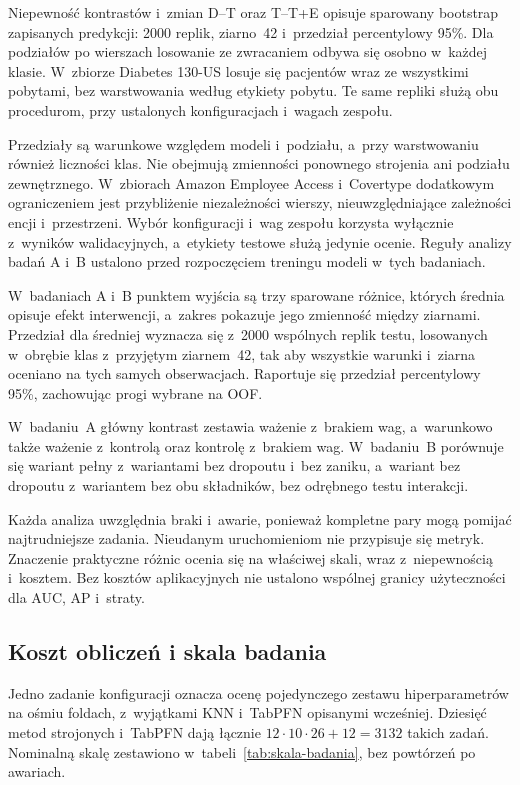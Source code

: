 Niepewność kontrastów i~zmian D--T oraz T--T+E opisuje sparowany bootstrap zapisanych predykcji: 2000 replik, ziarno~42 i~przedział percentylowy 95\%. Dla podziałów po wierszach losowanie ze zwracaniem odbywa się osobno w~każdej klasie. W~zbiorze Diabetes 130-US losuje się pacjentów wraz ze wszystkimi pobytami, bez warstwowania według etykiety pobytu. Te same repliki służą obu procedurom, przy ustalonych konfiguracjach i~wagach zespołu.

Przedziały są warunkowe względem modeli i~podziału, a~przy warstwowaniu również liczności klas. Nie obejmują zmienności ponownego strojenia ani podziału zewnętrznego. W~zbiorach Amazon Employee Access i~Covertype dodatkowym ograniczeniem jest przybliżenie niezależności wierszy, nieuwzględniające zależności encji i~przestrzeni. Wybór konfiguracji i~wag zespołu korzysta wyłącznie z~wyników walidacyjnych, a~etykiety testowe służą jedynie ocenie. Reguły analizy badań A i~B ustalono przed rozpoczęciem treningu modeli w~tych badaniach.

W~badaniach A i~B punktem wyjścia są trzy sparowane różnice, których średnia opisuje efekt interwencji, a~zakres pokazuje jego zmienność między ziarnami. Przedział dla średniej wyznacza się z~2000 wspólnych replik testu, losowanych w~obrębie klas z~przyjętym ziarnem~42, tak aby wszystkie warunki i~ziarna oceniano na tych samych obserwacjach. Raportuje się przedział percentylowy 95\%, zachowując progi wybrane na OOF.

W~badaniu~A główny kontrast zestawia ważenie z~brakiem wag, a~warunkowo także ważenie z~kontrolą oraz kontrolę z~brakiem wag. W~badaniu~B porównuje się wariant pełny z~wariantami bez dropoutu i~bez zaniku, a~wariant bez dropoutu z~wariantem bez obu składników, bez odrębnego testu interakcji.

Każda analiza uwzględnia braki i~awarie, ponieważ kompletne pary mogą pomijać najtrudniejsze zadania. Nieudanym uruchomieniom nie przypisuje się metryk. Znaczenie praktyczne różnic ocenia się na właściwej skali, wraz z~niepewnością i~kosztem. Bez kosztów aplikacyjnych nie ustalono wspólnej granicy użyteczności dla AUC, AP i~straty.

\subsection{Koszt obliczeń i skala badania}
\label{sec:koszt-metodyka}

Jedno zadanie konfiguracji oznacza ocenę pojedynczego zestawu hiperparametrów na ośmiu foldach, z~wyjątkami KNN i~TabPFN opisanymi wcześniej. Dziesięć metod strojonych i~TabPFN dają łącznie $12\cdot10\cdot26+12=3132$ takich zadań. Nominalną skalę zestawiono w~tabeli~\ref{tab:skala-badania}, bez powtórzeń po awariach.


